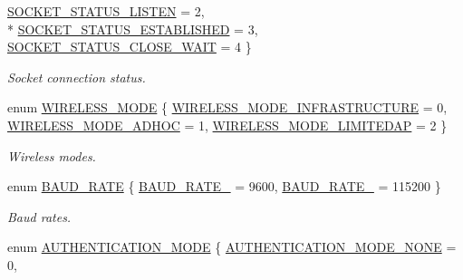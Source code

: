 \begin{DoxyCompactItemize}
\hyperlink{group__wireless__interface_ggab7faea06bd57469129426e00fcdfe8c7a91888376ff31f50986be7e2eaa17e732}{S\+O\+C\+K\+E\+T\+\_\+\+S\+T\+A\+T\+U\+S\+\_\+\+L\+I\+S\+T\+EN} = 2, 
\\*
\hyperlink{group__wireless__interface_ggab7faea06bd57469129426e00fcdfe8c7a09a0124f619b539930828c3a0f14c1fc}{S\+O\+C\+K\+E\+T\+\_\+\+S\+T\+A\+T\+U\+S\+\_\+\+E\+S\+T\+A\+B\+L\+I\+S\+H\+ED} = 3, 
\hyperlink{group__wireless__interface_ggab7faea06bd57469129426e00fcdfe8c7a4c100900fae92e68bbbcce4bee19997f}{S\+O\+C\+K\+E\+T\+\_\+\+S\+T\+A\+T\+U\+S\+\_\+\+C\+L\+O\+S\+E\+\_\+\+W\+A\+IT} = 4
 \}\begin{DoxyCompactList}\small\item\em Socket connection status. \end{DoxyCompactList}
\item 
enum \hyperlink{group__wireless__interface_gaf3e0c98d38c9b4b8b78f40523ae08711}{W\+I\+R\+E\+L\+E\+S\+S\+\_\+\+M\+O\+DE} \{ \hyperlink{group__wireless__interface_ggaf3e0c98d38c9b4b8b78f40523ae08711a909b5f1447f711ed8c7839953018ce25}{W\+I\+R\+E\+L\+E\+S\+S\+\_\+\+M\+O\+D\+E\+\_\+\+I\+N\+F\+R\+A\+S\+T\+R\+U\+C\+T\+U\+RE} = 0, 
\hyperlink{group__wireless__interface_ggaf3e0c98d38c9b4b8b78f40523ae08711a5eaf3b1c417cbff549cd4543410d46c1}{W\+I\+R\+E\+L\+E\+S\+S\+\_\+\+M\+O\+D\+E\+\_\+\+A\+D\+H\+OC} = 1, 
\hyperlink{group__wireless__interface_ggaf3e0c98d38c9b4b8b78f40523ae08711ad1a07cafdcb7aff62e0334c7f4af3705}{W\+I\+R\+E\+L\+E\+S\+S\+\_\+\+M\+O\+D\+E\+\_\+\+L\+I\+M\+I\+T\+E\+D\+AP} = 2
 \}\begin{DoxyCompactList}\small\item\em Wireless modes. \end{DoxyCompactList}
\item 
enum \hyperlink{group__wireless__interface_gafd83f18bb43add6a2eaf3228fec2fed7}{B\+A\+U\+D\+\_\+\+R\+A\+TE} \{ \hyperlink{group__wireless__interface_ggafd83f18bb43add6a2eaf3228fec2fed7a5c09d714c6010352674bea38d9de4b62}{B\+A\+U\+D\+\_\+\+R\+A\+T\+E\+\_} = 9600, 
\hyperlink{group__wireless__interface_ggafd83f18bb43add6a2eaf3228fec2fed7adb1db8d5e6fa7532419e3f2dd8a0effd}{B\+A\+U\+D\+\_\+\+R\+A\+T\+E\+\_} = 115200
 \}\begin{DoxyCompactList}\small\item\em Baud rates. \end{DoxyCompactList}
\item 
enum \hyperlink{group__wireless__interface_gab857a286e4eb7fe1039f12ab48d4a3be}{A\+U\+T\+H\+E\+N\+T\+I\+C\+A\+T\+I\+O\+N\+\_\+\+M\+O\+DE} \{ \hyperlink{group__wireless__interface_ggab857a286e4eb7fe1039f12ab48d4a3bea1025a11247d1d2212a0705e54becc891}{A\+U\+T\+H\+E\+N\+T\+I\+C\+A\+T\+I\+O\+N\+\_\+\+M\+O\+D\+E\+\_\+\+N\+O\+NE} = 0, 

\end{DoxyCompactItemize}
